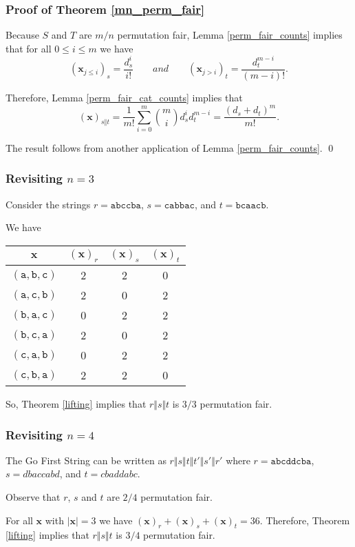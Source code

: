 \documentclass[aspectratio=169]{beamer}
\begin{document}
\begin{frame}[triangle=siiblue]
\frametitle{Proof of Theorem \ref{mn_perm_fair}}
Because $S$ and $T$ are $m/n$ permutation fair,  Lemma \ref{perm_fair_counts} implies that for all $0 \leq i \leq m$ we have
\begin{equation*}
	(\mathbf{x}_{j\leq i})_s = \frac{d_s^i}{i!}  \qquad and \qquad (\mathbf{x}_{j > i})_t = \frac{d_t^{m-i}}{(m-i)!}.
\end{equation*}

\vfill

Therefore,  Lemma \ref{perm_fair_cat_counts} implies that
\begin{equation*}
(\mathbf{x})_{s \Vert t} = \frac{1}{m!} \sum_{i=0}^m \binom{m}{i} d_s^i d_t^{m-i} = \frac{(d_s + d_t)^m}{m!}. 
\end{equation*}

The result follows from another application of Lemma \ref{perm_fair_counts}.  \qed
\end{frame}


\begin{frame}[triangle=siiblue]
\frametitle{Revisiting $n=3$}
Consider the strings $r = \texttt{abccba}$, $s = \texttt{cabbac}$, and $t = \texttt{bcaacb}$.


\vfill

We have
\begin{table}
\begin{tabular}{c ccc} \toprule
$\mathbf{x}$ & $(\mathbf{x})_r$ & $(\mathbf{x})_s$ & $(\mathbf{x})_t$ \\ \midrule
$(\texttt{a}, \texttt{b}, \texttt{c})$ & 2 & 2 & 0 \\
$(\texttt{a}, \texttt{c}, \texttt{b})$ & 2 & 0 & 2 \\
$(\texttt{b}, \texttt{a}, \texttt{c})$ & 0 & 2 & 2 \\
$(\texttt{b}, \texttt{c}, \texttt{a})$ & 2 & 0 & 2 \\
$(\texttt{c}, \texttt{a}, \texttt{b})$ & 0 & 2 & 2 \\
$(\texttt{c}, \texttt{b}, \texttt{a})$ &  2 & 2 & 0 \\ \bottomrule
\end{tabular}
\end{table}

\vfill

So, Theorem \ref{lifting} implies that $r \Vert s \Vert t$ is $3/3$ permutation fair. 
\end{frame}

\begin{frame}[triangle=siiblue]
\frametitle{Revisiting $n=4$}
The Go First String can be written as $r \Vert s \Vert t \Vert t' \Vert s' \Vert r'$ where $r = \texttt{abcddcba}$,  $s = dbaccabd$, and  $t = cbaddabc$.

\vfill

Observe that $r$,  $s$ and $t$ are $2/4$ permutation fair.

\vfill

For all $\mathbf{x}$ with $|\mathbf{x}| = 3$ we have $(\mathbf{x})_r + (\mathbf{x})_s + (\mathbf{x})_t = 36$. Therefore, Theorem \ref{lifting} implies that $r \Vert s \Vert t$ is $3/4$ permutation fair.
\end{frame}
\end{document}

